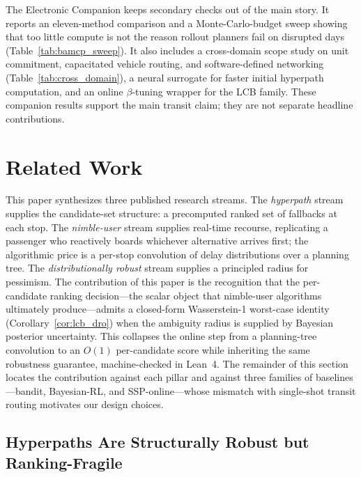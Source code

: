 \documentclass[opre,dblanonrev]{informs4}
\begin{document}
The Electronic Companion keeps secondary checks out of the main
story. It reports an eleven-method comparison and a
Monte-Carlo-budget sweep showing that too little compute is not the
reason rollout planners fail on disrupted days
(Table~\ref{tab:bamcp_sweep}). It also includes a cross-domain scope
study on unit commitment, capacitated vehicle routing, and
software-defined networking (Table~\ref{tab:cross_domain}), a neural
surrogate for faster initial hyperpath computation, and an online
$\beta$-tuning wrapper for the LCB family. These companion results
support the main transit claim; they are not separate headline
contributions.

\section{Related Work}
\label{sec:related}

This paper synthesizes three published research streams. The
\emph{hyperpath} stream
\citep{spiess1989,nguyen1988,dibbelt2013,durner2024}
supplies the candidate-set structure: a precomputed ranked set of
fallbacks at each stop. The \emph{nimble-user} stream
\citep{durner2024} supplies real-time recourse, replicating a
passenger who reactively boards whichever alternative arrives
first; the algorithmic price is a per-stop convolution of delay
distributions over a planning tree. The \emph{distributionally
robust} stream \citep{esfahani2018,blanchet2019} supplies a
principled radius for pessimism. The contribution of this paper is
the recognition that the per-candidate ranking decision---the
scalar object that nimble-user algorithms ultimately produce---admits
a closed-form Wasserstein-1 worst-case identity
(Corollary~\ref{cor:lcb_dro}) when the ambiguity radius is supplied
by Bayesian posterior uncertainty. This collapses the online step
from a planning-tree convolution to an $O(1)$ per-candidate score
while inheriting the same robustness guarantee, machine-checked in
Lean~4. The remainder of this section locates the contribution
against each pillar and against three families of baselines---bandit,
Bayesian-RL, and SSP-online---whose mismatch with single-shot transit
routing motivates our design choices.

\subsection{Hyperpaths Are Structurally Robust but Ranking-Fragile}
\end{document}
